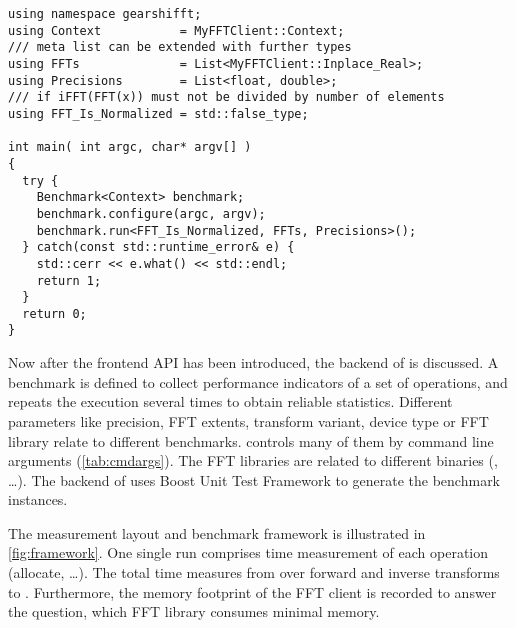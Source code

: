 \begin{lstlisting}[caption={Using FFT client types to run the benchmarks},label={lst:implfftusingp2}]
using namespace gearshifft;
using Context           = MyFFTClient::Context;         
/// meta list can be extended with further types
using FFTs              = List<MyFFTClient::Inplace_Real>;
using Precisions        = List<float, double>;   
/// if iFFT(FFT(x)) must not be divided by number of elements
using FFT_Is_Normalized = std::false_type;       

int main( int argc, char* argv[] )                       
{                                                        
  try {                                                  
    Benchmark<Context> benchmark;
    benchmark.configure(argc, argv);                     
    benchmark.run<FFT_Is_Normalized, FFTs, Precisions>();
  } catch(const std::runtime_error& e) {
    std::cerr << e.what() << std::endl;                  
    return 1;                                            
  }                                                      
  return 0;                                              
}                                                        
\end{lstlisting}


Now after the frontend API has been introduced, the backend of \gearshifft{} is discussed.
A benchmark is defined to collect performance indicators of a set of operations, and repeats the execution several times to obtain reliable statistics. Different parameters like precision, FFT extents, transform variant, device type or FFT library relate to different benchmarks.
\gearshifft{} controls many of them by command line arguments (\cref{tab:cmdargs}). The FFT libraries are related to different \gearshifft{} binaries (, \ldots).
The backend of \gearshifft{} uses Boost Unit Test Framework to generate the benchmark instances. %

The measurement layout and benchmark framework is illustrated in \cref{fig:framework}.
One single run comprises time measurement of each operation (allocate, \ldots). 
The total time measures from  over forward and inverse transforms to .
Furthermore, the memory footprint of the FFT client is recorded to answer the question, which FFT library consumes minimal memory.

